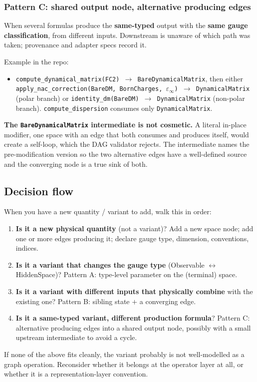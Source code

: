 \documentclass[11pt,a4paper]{article}
\begin{document}
\subsubsection*{Pattern C: shared output node, alternative producing edges}

When several formulas produce the \textbf{same-typed} output with the \textbf{same
gauge classification}, from different inputs. Downstream is unaware of which path
was taken; provenance and adapter specs record it.

Example in the repo:
\begin{itemize}[leftmargin=2em]
  \item \texttt{compute\_dynamical\_matrix(FC2) $\to$ BareDynamicalMatrix}, then
        either \texttt{apply\_nac\_correction(BareDM, BornCharges, $\varepsilon_\infty$)
        $\to$ DynamicalMatrix} (polar branch) or \texttt{identity\_dm(BareDM) $\to$
        DynamicalMatrix} (non-polar branch). \texttt{compute\_dispersion} consumes
        only \texttt{DynamicalMatrix}.
\end{itemize}
\textbf{The \texttt{BareDynamicalMatrix} intermediate is not cosmetic.} A literal
in-place modifier, one space with an edge that both consumes and produces itself,
would create a self-loop, which the DAG validator rejects. The intermediate names
the pre-modification version so the two alternative edges have a well-defined
source and the converging node is a true sink of both.

\subsection{Decision flow}

When you have a new quantity / variant to add, walk this in order:
\begin{enumerate}[leftmargin=2em]
  \item \textbf{Is it a new physical quantity} (not a variant)? Add a new space
        node; add one or more edges producing it; declare gauge type, dimension,
        conventions, indices.
  \item \textbf{Is it a variant that changes the gauge type} (Observable $\leftrightarrow$
        HiddenSpace)? Pattern A: type-level parameter on the (terminal) space.
  \item \textbf{Is it a variant with different inputs that physically combine} with
        the existing one? Pattern B: sibling state $+$ a converging edge.
  \item \textbf{Is it a same-typed variant, different production formula}? Pattern
        C: alternative producing edges into a shared output node, possibly with a
        small upstream intermediate to avoid a cycle.
\end{enumerate}
If none of the above fits cleanly, the variant probably is not well-modelled as a
graph operation. Reconsider whether it belongs at the operator layer at all, or
whether it is a representation-layer convention.
\end{document}
